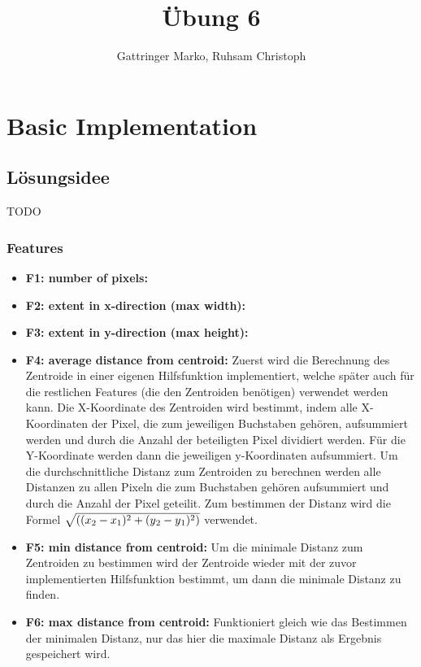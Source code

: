 \documentclass[11pt, a4paper, twoside]{article}   	%
\title{Übung 6}
\author{Gattringer Marko, Ruhsam Christoph}
\begin{document}
\setlength{\headheight}{15mm}



\section{Basic Implementation}
\subsection{Lösungsidee}
TODO

\subsubsection{Features}

\begin{itemize}
	\item \textbf{F1: number of pixels: } %
	\item \textbf{F2: extent in x-direction (max width): }  %
	\item \textbf{F3: extent in y-direction (max height): } %
	
	\item \textbf{F4: average distance from centroid: } Zuerst wird die Berechnung des Zentroide in einer eigenen Hilfsfunktion implementiert, welche später auch für die restlichen Features (die den Zentroiden benötigen) verwendet werden kann. Die X-Koordinate des Zentroiden wird bestimmt, indem alle X-Koordinaten der Pixel, die zum jeweiligen Buchstaben gehören, aufsummiert werden und durch die Anzahl der beteiligten Pixel dividiert werden. Für die Y-Koordinate werden dann die jeweiligen y-Koordinaten aufsummiert. 
	Um die durchschnittliche Distanz zum Zentroiden zu berechnen werden alle Distanzen zu allen Pixeln die zum Buchstaben gehören aufsummiert und durch die Anzahl der Pixel geteilit. Zum bestimmen der Distanz wird die Formel $\sqrt{((x\textsubscript{2} - x\textsubscript{1})^2 + (y\textsubscript{2} - y\textsubscript{1})^2)}$ verwendet.
	
	\item \textbf{F5: min distance from centroid: } Um die minimale Distanz zum Zentroiden zu bestimmen wird der Zentroide wieder mit der zuvor implementierten Hilfsfunktion bestimmt, um dann die minimale Distanz zu finden.
	
	\item \textbf{F6: max distance from centroid: } Funktioniert gleich wie das Bestimmen der minimalen Distanz, nur das hier die maximale Distanz als Ergebnis gespeichert wird.
	

\end{itemize}
\end{document}
